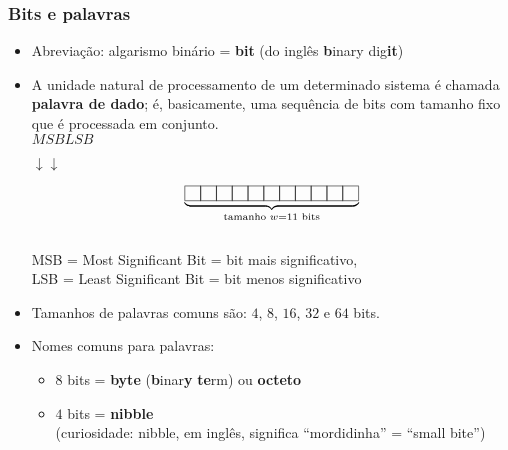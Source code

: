 \documentclass{beamer}
\newcommand{\comment}[1]{{\color{structure.fg!70!white}\footnotesize #1}}
\begin{document}
\begin{frame}
\frametitle{Bits e palavras}

\begin{itemize}
\item Abreviação: algarismo binário = \textbf{bit} (do inglês \textbf{b}inary dig\textbf{it})
\pause
\item A unidade natural de processamento de um determinado sistema é chamada \textbf{palavra de dado}; é, basicamente, uma sequência de bits com tamanho fixo que é processada em conjunto.\\[6pt]
\hspace*{\fill}$MSB$\hspace{9em}$LSB$\hspace*{\fill}

\vspace{-3pt}

\hspace*{\fill}$\downarrow$\hspace{10.5em}$\downarrow$\hspace*{\fill}

\vspace{-16pt}

$$\underbrace{\fbox{\phantom{a}}\hspace{-0.5pt}\fbox{\phantom{a}}\hspace{-0.5pt}\fbox{\phantom{a}}\hspace{-0.5pt}\fbox{\phantom{a}}\hspace{-0.5pt}\fbox{\phantom{a}}\hspace{-0.5pt}\fbox{\phantom{a}}\hspace{-0.5pt}\fbox{\phantom{a}}\hspace{-0.5pt}\fbox{\phantom{a}}\hspace{-0.5pt}\fbox{\phantom{a}}\hspace{-0.5pt}\fbox{\phantom{a}}\hspace{-0.5pt}\fbox{\phantom{a}}}_{\text{tamanho } w = 11 \text{ bits}}$$\\
\comment{MSB = Most Significant Bit = bit mais significativo,\\LSB = Least Significant Bit = bit menos significativo}
\pause
\item Tamanhos de palavras comuns são: $4$, $8$, $16$, $32$ e $64$ bits.
\pause
\item Nomes comuns para palavras:
\begin{itemize}
\item $8$ bits = \textbf{byte} (\textbf{b}inar\textbf{y} \textbf{te}rm) ou \textbf{octeto}
\item $4$ bits = \textbf{nibble}\\\comment{\small(curiosidade: nibble, em inglês, significa ``mordidinha'' = ``small bite'')}
\end{itemize}
\end{itemize}

\end{frame}
\end{document}

